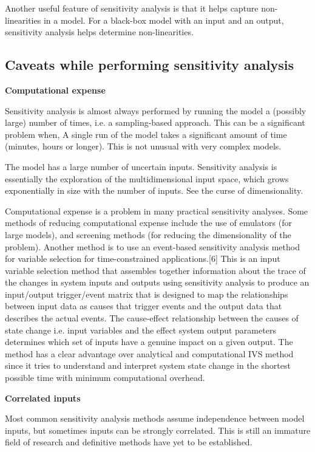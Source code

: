 Another useful feature of sensitivity analysis is that it helps capture non-linearities in a model. For a black-box model with an input and an output, sensitivity analysis helps determine non-linearities.



\subsection{Caveats while performing sensitivity analysis}


\textbf{Computational expense}

Sensitivity analysis is almost always performed by running the model a (possibly large) number of times, i.e. a sampling-based approach. This can be a significant problem when, A single run of the model takes a significant amount of time (minutes, hours or longer). This is not unusual with very complex models.

The model has a large number of uncertain inputs. Sensitivity analysis is essentially the exploration of the multidimensional input space, which grows exponentially in size with the number of inputs. See the curse of dimensionality.

Computational expense is a problem in many practical sensitivity analyses. Some methods of reducing computational expense include the use of emulators (for large models), and screening methods (for reducing the dimensionality of the problem). Another method is to use an event-based sensitivity analysis method for variable selection for time-constrained applications.[6] This is an input variable selection method that assembles together information about the trace of the changes in system inputs and outputs using sensitivity analysis to produce an input/output trigger/event matrix that is designed to map the relationships between input data as causes that trigger events and the output data that describes the actual events. The cause-effect relationship between the causes of state change i.e. input variables and the effect system output parameters determines which set of inputs have a genuine impact on a given output. The method has a clear advantage over analytical and computational IVS method since it tries to understand and interpret system state change in the shortest possible time with minimum computational overhead.

\textbf{Correlated inputs}

Most common sensitivity analysis methods assume independence between model inputs, but sometimes inputs can be strongly correlated. This is still an immature field of research and definitive methods have yet to be established.

